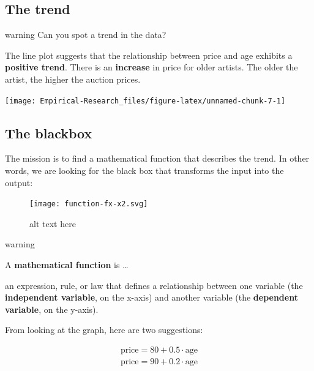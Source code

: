 \documentclass[
]{book}
\begin{document}
\hypertarget{the-trend}{%
\subsection{The trend}\label{the-trend}}

\begin{infobox}warning
Can you spot a trend in the data?

\end{infobox}

The line plot suggests that the relationship between price and age exhibits a \textbf{positive trend}. There is an \textbf{increase} in price for older artists. The older the artist, the higher the auction prices.

\begin{center}\texttt{[image: Empirical-Research\_files/figure-latex/unnamed-chunk-7-1]} \end{center}

\hypertarget{the-blackbox}{%
\subsection{The blackbox}\label{the-blackbox}}

The mission is to find a mathematical function that describes the trend. In other words, we are looking for the black box that transforms the input into the output:

\begin{figure}
\centering
\texttt{[image: function-fx-x2.svg]}
\caption{alt text here}
\end{figure}

\begin{infobox}warning

A \textbf{mathematical function} is \ldots{}

an expression, rule, or law that defines a relationship between one variable (the \textbf{independent variable}, on the x-axis) and another variable (the \textbf{dependent variable}, on the y-axis).

\end{infobox}

From looking at the graph, here are two suggestions:

\[ \begin{align}
\text{price} = 80 + 0.5 \cdot \text{age} \tag{Suggestion 1} \\
\text{price} = 90 + 0.2 \cdot \text{age} \tag{Suggestion 2} \\
\end{align}\]
\end{document}
